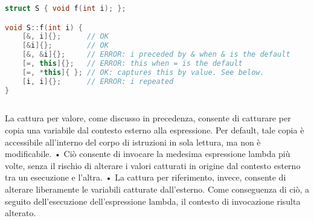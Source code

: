 \begin{lstlisting}[language=c++]
struct S { void f(int i); };

void S::f(int i) {
    [&, i]{};      // OK
    [&i]{};        // OK
    [&, &i]{};     // ERROR: i preceded by & when & is the default
    [=, this]{};   // ERROR: this when = is the default
    [=, *this]{ }; // OK: captures this by value. See below.
    [i, i]{};      // ERROR: i repeated
}
    
\end{lstlisting}

La cattura per valore, come discusso in precedenza, consente di
catturare per copia una variabile dal contesto esterno alla
espressione. Per default, tale copia è accessibile all’interno del corpo
di istruzioni in sola lettura, ma non è modificabile.
• Ciò consente di invocare la medesima espressione lambda più volte,
senza il rischio di alterare i valori catturati in origine dal contesto
esterno tra un esecuzione e l’altra.
• La cattura per riferimento, invece, consente di alterare liberamente
le variabili catturate dall’esterno. Come conseguenza di ciò, a
seguito dell’esecuzione dell’espressione lambda, il contesto di
invocazione risulta alterato. 

